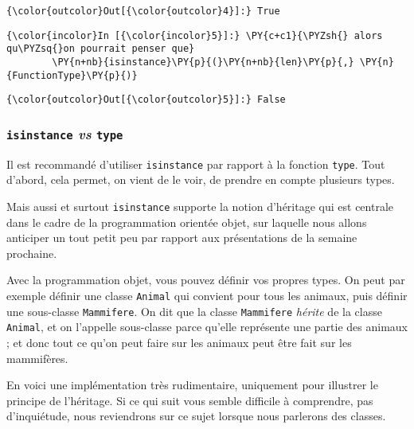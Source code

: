 \begin{Verbatim}[commandchars=\\\{\}]
{\color{outcolor}Out[{\color{outcolor}4}]:} True
\end{Verbatim}
            
    \begin{Verbatim}[commandchars=\\\{\}]
{\color{incolor}In [{\color{incolor}5}]:} \PY{c+c1}{\PYZsh{} alors qu\PYZsq{}on pourrait penser que}
        \PY{n+nb}{isinstance}\PY{p}{(}\PY{n+nb}{len}\PY{p}{,} \PY{n}{FunctionType}\PY{p}{)}
\end{Verbatim}


\begin{Verbatim}[commandchars=\\\{\}]
{\color{outcolor}Out[{\color{outcolor}5}]:} False
\end{Verbatim}
            
    \hypertarget{isinstance-vs-type}{%
\subsubsection{\texorpdfstring{\texttt{isinstance} \emph{vs}
\texttt{type}}{isinstance vs type}}\label{isinstance-vs-type}}

    Il est recommandé d'utiliser \texttt{isinstance} par rapport à la
fonction \texttt{type}. Tout d'abord, cela permet, on vient de le voir,
de prendre en compte plusieurs types.

Mais aussi et surtout \texttt{isinstance} supporte la notion d'héritage
qui est centrale dans le cadre de la programmation orientée objet, sur
laquelle nous allons anticiper un tout petit peu par rapport aux
présentations de la semaine prochaine.

Avec la programmation objet, vous pouvez définir vos propres types. On
peut par exemple définir une classe \texttt{Animal} qui convient pour
tous les animaux, puis définir une sous-classe \texttt{Mammifere}. On
dit que la classe \texttt{Mammifere} \emph{hérite} de la classe
\texttt{Animal}, et on l'appelle sous-classe parce qu'elle représente
une partie des animaux ; et donc tout ce qu'on peut faire sur les
animaux peut être fait sur les mammifères.

En voici une implémentation très rudimentaire, uniquement pour illustrer
le principe de l'héritage. Si ce qui suit vous semble difficile à
comprendre, pas d'inquiétude, nous reviendrons sur ce sujet lorsque nous
parlerons des classes.

